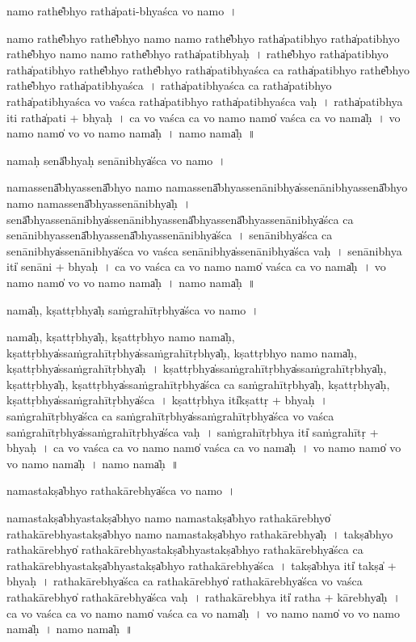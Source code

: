 \documentclass[parskip, DIV=14]{scrartcl}
\begin{document}
{namo॒ rathe̎bhyo॒ ratha̍pati-bhyaśca vo॒ namo॒~।

namo॒ rathe̎bhyo॒ rathe̎bhyo॒ namo॒ namo॒ rathe̎bhyo॒ ratha̍patibhyo॒ ratha̍patibhyo॒ rathe̎bhyo॒ namo॒ namo॒ rathe̎bhyo॒ ratha̍patibhyaḥ~।
rathe̎bhyo॒ ratha̍patibhyo॒ ratha̍patibhyo॒ rathe̎bhyo॒ rathe̎bhyo॒ ratha̍patibhyaśca ca॒ ratha̍patibhyo॒ rathe̎bhyo॒ rathe̎bhyo॒ ratha̍patibhyaśca~।
ratha̍patibhyaśca ca॒ ratha̍patibhyo॒ ratha̍patibhyaśca vo vaśca॒ ratha̍patibhyo॒ ratha̍patibhyaśca vaḥ~।
ratha̍patibhya॒ iti॒ ratha̍pati + bhya॒ḥ~।
ca॒ vo॒ va॒śca॒ ca॒ vo॒ namo॒ namo̍ vaśca ca vo॒ nama̍ḥ~।
vo॒ namo॒ namo̍ vo vo॒ namo॒ nama̍ḥ~।
namo॒ nama̍ḥ~॥ 

nama॒ḥ senā̎bhyaḥ senā॒nibhya̍śca vo॒ namo॒~।

nama॒ssenā̎bhya॒ssenā̎bhyo॒ namo॒ nama॒ssenā̎bhyassenā॒nibhya̍ssenā॒nibhya॒ssenā̎bhyo॒ namo॒ nama॒ssenā̎bhyassenā॒nibhya̍ḥ~।
senā̎bhyassenā॒nibhya̍ssenā॒nibhya॒ssenā̎bhya॒ssenā̎bhyassenā॒nibhya̍śca ca senā॒nibhya॒ssenā̎bhya॒ssenā̎bhyassenā॒nibhya̍śca~।
se॒nā॒nibhya̍śca ca senā॒nibhya̍ssenā॒nibhya̍śca vo vaśca senā॒nibhya̍ssenā॒nibhya̍śca vaḥ~।
se॒nā॒nibhya॒ iti̍ senā॒ni + bhya॒ḥ~।
ca॒ vo॒ va॒śca॒ ca॒ vo॒ namo॒ namo̍ vaśca ca vo॒ nama̍ḥ~।
vo॒ namo॒ namo̍ vo vo॒ namo॒ nama̍ḥ~।
namo॒ nama̍ḥ~॥ 

nama̍ḥ, kṣa॒ttṛbhya̍ḥ saṁgrahī॒tṛbhya̍śca vo॒ namo॒~।

nama̍ḥ, kṣa॒ttṛbhya̍ḥ, kṣa॒ttṛbhyo॒ namo॒ nama̍ḥ, kṣa॒ttṛbhya̍ssaṁgrahī॒tṛbhya̍ssaṁgrahī॒tṛbhya̍ḥ, kṣa॒ttṛbhyo॒ namo॒ nama̍ḥ, kṣa॒ttṛbhya̍ssaṁgrahī॒tṛbhya̍ḥ~।
kṣa॒ttṛbhya̍ssaṁgrahī॒tṛbhya̍ssaṁgrahī॒tṛbhya̍ḥ, kṣa॒ttṛbhya̍ḥ, kṣa॒ttṛbhya̍ssaṁgrahī॒tṛbhya̍śca ca saṁgrahī॒tṛbhya̍ḥ, kṣa॒ttṛbhya̍ḥ, kṣa॒ttṛbhya̍ssaṁgrahī॒tṛbhya̍śca~।
kṣa॒ttṛbhya॒ iti̍kṣa॒ttṛ + bhya॒ḥ~।
sa॒ṁgra॒hī॒tṛbhya̍śca ca  saṁgrahī॒tṛbhya̍ssaṁgrahī॒tṛbhya̍śca vo vaśca saṁgrahī॒tṛbhya̍ssaṁgrahī॒tṛbhya̍śca vaḥ~।
sa॒ṁgra॒hī॒tṛbhya॒ iti̍ saṁgrahī॒tṛ + bhya॒ḥ~।
ca॒ vo॒ va॒śca॒ ca॒ vo॒ namo॒ namo̍ vaśca ca vo॒ nama̍ḥ~।
vo॒ namo॒ namo̍ vo vo॒ namo॒ nama̍ḥ~।
namo॒ nama̍ḥ~॥ 

nama॒stakṣa̍bhyo rathakā॒rebhya̍śca vo॒ namo॒~।

nama॒stakṣa̍bhya॒stakṣa̍bhyo॒ namo॒ nama॒stakṣa̍bhyo rathakā॒rebhyo̍ rathakā॒rebhya॒stakṣa̍bhyo॒ namo॒ nama॒stakṣa̍bhyo rathakā॒rebhya̍ḥ~।
takṣa̍bhyo rathakā॒rebhyo̍ rathakā॒rebhya॒stakṣa̍bhya॒stakṣa̍bhyo rathakā॒rebhya̍śca ca rathakā॒rebhya॒stakṣa̍bhya॒stakṣa̍bhyo rathakā॒rebhya̍śca~।
takṣa̍bhya॒ iti̍ takṣa̍ + bhya॒ḥ~।
ra॒tha॒kā॒rebhya̍śca ca rathakā॒rebhyo̍ rathakā॒rebhya̍śca vo vaśca rathakā॒rebhyo̍ rathakā॒rebhya̍śca vaḥ~।
ra॒tha॒kā॒rebhya॒ iti̍ ratha + kā॒rebhya̍ḥ~।
ca॒ vo॒ va॒śca॒ ca॒ vo॒ namo॒ namo̍ vaśca ca vo॒ nama̍ḥ~।
vo॒ namo॒ namo̍ vo vo॒ namo॒ nama̍ḥ~।
namo॒ nama̍ḥ~॥  

}
\end{document}
